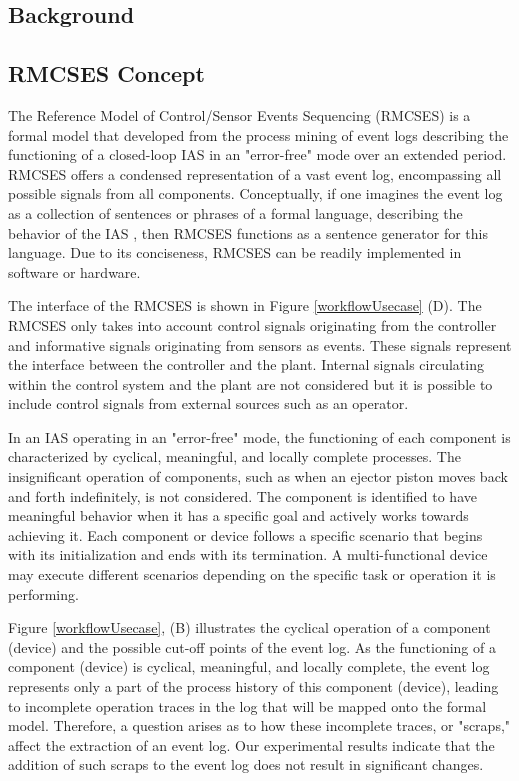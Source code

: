\begin{bibunit}
\section{Background}
\label{background}

\subsection{RMCSES Concept}
\label{rmcses}

The Reference Model of Control/Sensor Events Sequencing (RMCSES) is a formal model that developed from the process mining  \cite{cook1998discovering} of event logs describing the functioning of a closed-loop IAS in an "error-free" mode over an extended period. RMCSES offers a condensed representation of a vast event log, encompassing all possible signals from all components. Conceptually, if one imagines the event log as a collection of sentences or phrases of a formal language, describing the behavior of the IAS \cite{sinha2019survey}, then RMCSES functions as a sentence generator for this language. Due to its conciseness, RMCSES can be readily implemented in software or hardware.


The interface of the RMCSES is shown in Figure \ref{workflowUsecase} (D). The RMCSES only takes into account control signals originating from the controller and informative signals originating from sensors as events. These signals represent the interface between the controller and the plant. Internal signals circulating within the control system and the plant are not considered but it is possible to include control signals from external sources such as an operator.




In an IAS operating in an "error-free" mode, the functioning of each component is characterized by cyclical, meaningful, and locally complete processes. The insignificant operation of components, such as when an ejector piston moves back and forth indefinitely, is not considered. The component is identified to have meaningful behavior when it has a specific goal and actively works towards achieving it. Each component or device follows a specific scenario that begins with its initialization and ends with its termination. A multi-functional device may execute different scenarios depending on the specific task or operation it is performing.

Figure \ref{workflowUsecase}, (B) illustrates the cyclical operation of a component (device) and the possible cut-off points of the event log. As the functioning of a component (device) is cyclical, meaningful, and locally complete, the event log represents only a part of the process history of this component (device), leading to incomplete operation traces in the log that will be mapped onto the formal model. Therefore, a question arises as to how these incomplete traces, or "scraps," affect the extraction of an event log. Our experimental results indicate that the addition of such scraps to the event log does not result in significant changes.


\end{bibunit}
